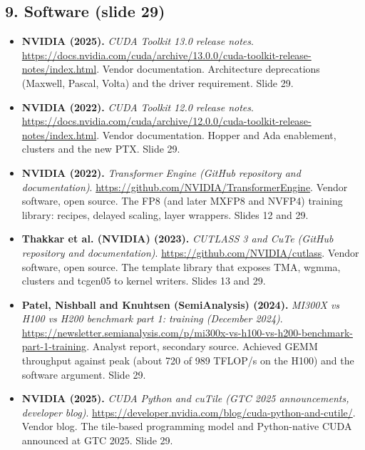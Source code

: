 \documentclass[11pt,letterpaper]{article}
\begin{document}
\subsection*{9. Software (slide 29)}
\begin{itemize}[leftmargin=1.2em,itemsep=3pt]\sloppy
\item \textbf{NVIDIA (2025).} \textit{CUDA Toolkit 13.0 release notes}. \url{https://docs.nvidia.com/cuda/archive/13.0.0/cuda-toolkit-release-notes/index.html}. Vendor documentation. Architecture deprecations (Maxwell, Pascal, Volta) and the driver requirement. Slide 29.
\item \textbf{NVIDIA (2022).} \textit{CUDA Toolkit 12.0 release notes}. \url{https://docs.nvidia.com/cuda/archive/12.0.0/cuda-toolkit-release-notes/index.html}. Vendor documentation. Hopper and Ada enablement, clusters and the new PTX. Slide 29.
\item \textbf{NVIDIA (2022).} \textit{Transformer Engine (GitHub repository and documentation)}. \url{https://github.com/NVIDIA/TransformerEngine}. Vendor software, open source. The FP8 (and later MXFP8 and NVFP4) training library: recipes, delayed scaling, layer wrappers. Slides 12 and 29.
\item \textbf{Thakkar et al. (NVIDIA) (2023).} \textit{CUTLASS 3 and CuTe (GitHub repository and documentation)}. \url{https://github.com/NVIDIA/cutlass}. Vendor software, open source. The template library that exposes TMA, wgmma, clusters and tcgen05 to kernel writers. Slides 13 and 29.
\item \textbf{Patel, Nishball and Knuhtsen (SemiAnalysis) (2024).} \textit{MI300X vs H100 vs H200 benchmark part 1: training (December 2024)}. \url{https://newsletter.semianalysis.com/p/mi300x-vs-h100-vs-h200-benchmark-part-1-training}. Analyst report, secondary source. Achieved GEMM throughput against peak (about 720 of 989 TFLOP/s on the H100) and the software argument. Slide 29.
\item \textbf{NVIDIA (2025).} \textit{CUDA Python and cuTile (GTC 2025 announcements, developer blog)}. \url{https://developer.nvidia.com/blog/cuda-python-and-cutile/}. Vendor blog. The tile-based programming model and Python-native CUDA announced at GTC 2025. Slide 29.
\end{itemize}
\end{document}
